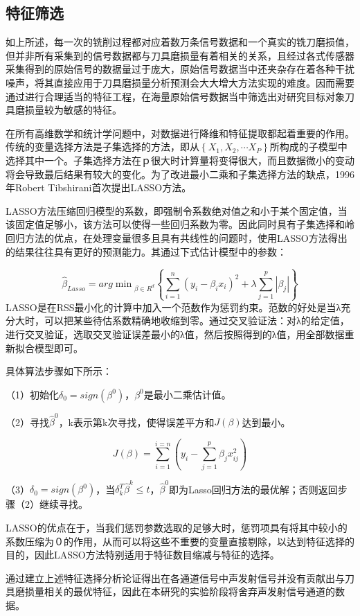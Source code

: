 % 
\subsection{特征筛选}
如上所述，每一次的铣削过程都对应着数万条信号数据和一个真实的铣刀磨损值，但并非所有采集到的信号数据都与刀具磨损量有着相关的关系，且经过各式传感器采集得到的原始信号的数据量过于庞大，原始信号数据当中还夹杂存在着各种干扰噪声，将其直接应用于刀具磨损量分析预测会大大增大方法实现的难度。因而需要通过进行合理适当的特征工程，在海量原始信号数据当中筛选出对研究目标对象刀具磨损量较为敏感的特征。\par
%
% 
在所有高维数学和统计学问题中，对数据进行降维和特征提取都起着重要的作用。传统的变量选择方法是子集选择的方法，即从$ \left\{ \left. X_1,X_2,\cdots X_P \right\} \right. $所构成的子模型中选择其中一个。子集选择方法在ｐ很大时计算量将变得很大，而且数据微小的变动将会导致最后结果有较大的变化。为了改进最小二乘和子集选择方法的缺点，1996年Robert Tibshirani首次提出LASSO方法。\par
LASSO方法压缩回归模型的系数，即强制令系数绝对值之和小于某个固定值，当该固定值足够小，该方法可以使得一些回归系数为零。因此同时具有子集选择和岭回归方法的优点，在处理变量很多且具有共线性的问题时，使用LASSO方法得出的结果往往具有更好的预测能力。其通过下式估计模型中的参数：\par
$$
\hat{\beta}_{Lasso}={arg\min}_{\beta \in R^{d}}\left\{ \left. \sum_{i=1}^n{\left( y_i-\beta _ix_i \right) ^2+\lambda \sum_{j=1}^p{\left| \beta _j \right|}} \right\} \right.
$$
LASSO是在RSS最小化的计算中加入一个范数作为惩罚约束。范数的好处是当λ充分大时，可以把某些待估系数精确地收缩到零。通过交叉验证法：对λ的给定值，进行交叉验证，选取交叉验证误差最小的λ值，然后按照得到的λ值，用全部数据重新拟合模型即可。\par
具体算法步骤如下所示：\par
（1）初始化$\delta _0 = sign\left( \beta ^0 \right)$，$\beta ^0$是最小二乘估计值。\par
（2）寻找$\hat{\beta}^{0}$，k表示第k次寻找，使得误差平方和$J\left( \beta \right)$达到最小。\par
$$ J\left( \beta \right) =\sum_{i=1}^{i=n}{\left( y_i-\sum_{j=1}^p{\beta _jx_{ij}^2} \right)} $$\par
（3）$\delta _0=sign\left( \beta ^0 \right) $，当$\delta _{k}^{T}\hat{\beta}^k \le t$，$\hat{\beta}^{0}$即为Lasso回归方法的最优解；否则返回步骤（2）继续寻找。\par
LASSO的优点在于，当我们惩罚参数选取的足够大时，惩罚项具有将其中较小的系数压缩为０的作用，从而可以将这些不重要的变量直接剔除，以达到特征选择的目的，因此LASSO方法特别适用于特征数目缩减与特征的选择。\par
通过建立上述特征选择分析论证得出在各通道信号中声发射信号并没有贡献出与刀具磨损量相关的最优特征，因此在本研究的实验阶段将舍弃声发射信号通道的数据。\par
% 
% 
